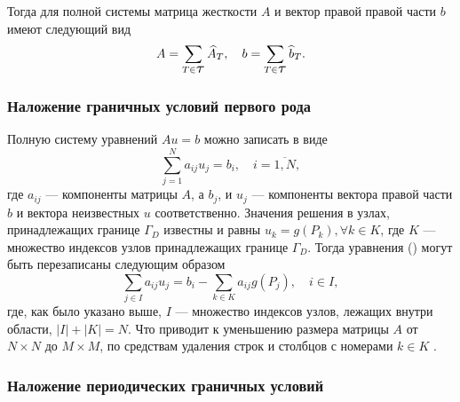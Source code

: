 \documentclass[12pt, a4paper]{article}
\newcommand\Tau{\scalerel*{\tau}{T}}
\begin{document}
				Тогда для полной системы матрица жесткости $A$ и вектор правой правой части $b$ имеют следующий вид
				\begin{equation*}
					A = \sum_{T \in \Tau} \widehat{A}_T, \quad 
					b = \sum_{T \in \Tau} \widehat{b}_T.
				\end{equation*}
				
			\subsubsection{Наложение граничных условий первого рода}
			
				Полную систему уравнений $A u = b$ можно записать в виде 
				\begin{equation}
					\sum_{j = 1}^{N} a_{ij} u_{j} = b_i, \quad i = \overline{1,N},
					\label{sys_in_index}
				\end{equation}
				где $a_{ij}$ --- компоненты матрицы $A$, а $b_{j}$, и $u_{j}$ --- компоненты вектора правой части $b$ и вектора неизвестных $u$ соответственно. Значения решения в узлах, принадлежащих границе $\Gamma_D$ известны и равны $u_k = g(P_k), \forall k \in K$, где $K$ --- множество индексов узлов принадлежащих границе $\Gamma_D$. Тогда уравнения () могут быть перезаписаны следующим образом
				\begin{equation}
					\sum_{j \in I} a_{ij} u_{j} = 
					b_i - \sum_{k \in K} a_{ij} g(P_j), 
					\quad i \in I,
					\label{sys_in_index_plus_dirichlet}
				\end{equation}
				где, как было указано выше, $I$ --- множество индексов узлов, лежащих внутри области, $|I| + |K| = N$. Что приводит к уменьшению размера  матрицы $A$ от $N \times N$ до $M \times M$, по средствам удаления строк и столбцов с номерами $k \in K$ \cite{Galanin}.
				
			\subsubsection{Наложение периодических граничных условий}
				
\end{document}
